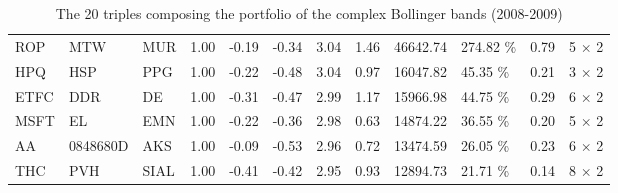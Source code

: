\documentclass[11pt,a4,twosided,singlespacing,titlepagenumber=on]{scrreprt}
\numberwithin{equation}{chapter} %
\theoremstyle{remark}
\begin{document}
\begin{table}[H]
\begin{adjustwidth}{-2.6cm}{}
\begin{tabular}{llllllllllll}
ROP  & MTW  & MUR  & 1.00 & -0.19 & -0.34 & 3.04 & 1.46 & 46642.74 & 274.82 \%& 0.79 & 5 $\times$ 2\\
HPQ  & HSP  & PPG  & 1.00 & -0.22 & -0.48 & 3.04 & 0.97 & 16047.82 & 45.35 \%& 0.21 & 3 $\times$ 2\\
ETFC  & DDR  & DE  & 1.00 & -0.31 & -0.47 & 2.99 & 1.17 & 15966.98 & 44.75 \%& 0.29 & 6 $\times$ 2\\
MSFT  & EL  & EMN  & 1.00 & -0.22 & -0.36 & 2.98 & 0.63 & 14874.22 & 36.55 \%& 0.20 & 5 $\times$ 2\\
AA  & 0848680D  & AKS  & 1.00 & -0.09 & -0.53 & 2.96 & 0.72 & 13474.59 & 26.05 \%& 0.23 & 6 $\times$ 2\\
THC  & PVH  & SIAL  & 1.00 & -0.41 & -0.42 & 2.95 & 0.93 & 12894.73 & 21.71 \%& 0.14 & 8 $\times$ 2\\
\hline
\end{tabular}
\caption{The 20 triples composing the portfolio of the complex Bollinger bands (2008-2009)}
\label{20_selected_triples_complex_bands_sv}
\end{adjustwidth}
\end{table}
\end{document}
